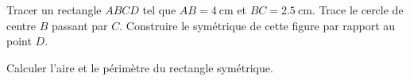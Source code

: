
\begin{exercice}\label{exosmath-0992}

    Tracer un rectangle $ABCD$ tel que $AB = \SI{4}{\centi\meter}$ et $BC = \SI{2.5}{\centi\meter}$. Trace le cercle de centre $B$ passant par $C$. Construire le symétrique de cette figure par rapport au point $D$.

    Calculer l'aire et le périmètre du rectangle symétrique.

\end{exercice}
